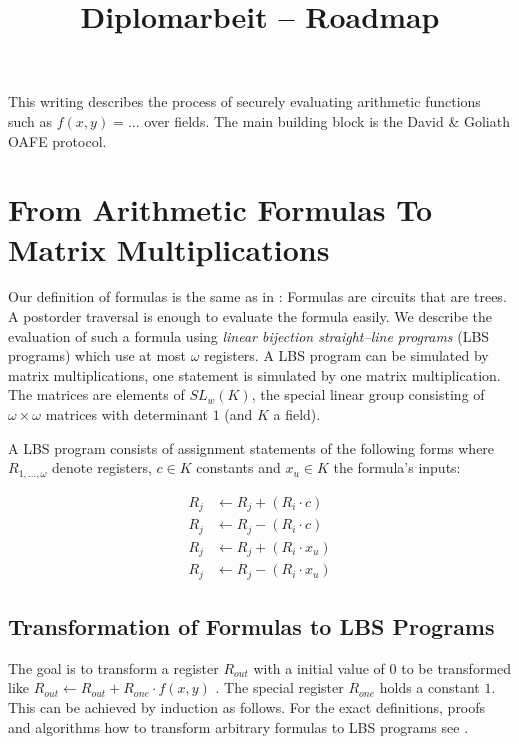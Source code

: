 \documentclass[12pt, a4paper]{article}
\title{Diplomarbeit -- Roadmap}
\begin{document}
\maketitle

This writing describes the process of securely evaluating arithmetic functions
such as $f(x,y) = ...$ over fields. The main building block is the David \&
Goliath OAFE protocol\cite{davidgoliath}.


\section{From Arithmetic Formulas To Matrix Multiplications}
\label{sec:FormulasToMatrixMuls}

Our definition of formulas is the same as in \cite{cleve91}: Formulas are
circuits that are trees. A postorder traversal is enough to evaluate the formula
easily. We describe the evaluation of such a formula using \emph{linear
bijection straight--line programs} (LBS programs)\cite{cleve91} which use at
most $\omega$ registers. A LBS program can be simulated by matrix
multiplications, one statement is simulated by one matrix multiplication. The
matrices are elements of $SL_w(K)$, the special linear group consisting of
$\omega \times \omega$ matrices with determinant $1$ (and $K$ a field).

A LBS program consists of assignment statements of the following
forms where $R_{1,...,\omega}$ denote registers, $c \in K$ constants and $x_u
\in K$ the formula's inputs:

\begin{align}
R_j & \leftarrow R_j + (R_i \cdot c) \\
R_j & \leftarrow R_j - (R_i \cdot c) \\
R_j & \leftarrow R_j + (R_i \cdot x_u) \\
R_j & \leftarrow R_j - (R_i \cdot x_u)
\end{align}


\subsection{Transformation of Formulas to LBS Programs}

The goal is to transform a register $R_{out}$ with a initial value of $0$ to be
transformed like $R_{out} \leftarrow R_{out} + R_{one} \cdot f(x,y)$ . The
special register $R_{one}$ holds a constant $1$. This can be achieved by
induction as follows.  For the exact definitions, proofs and algorithms how to
transform arbitrary formulas to LBS programs see \cite{cleve91}.
\end{document}
